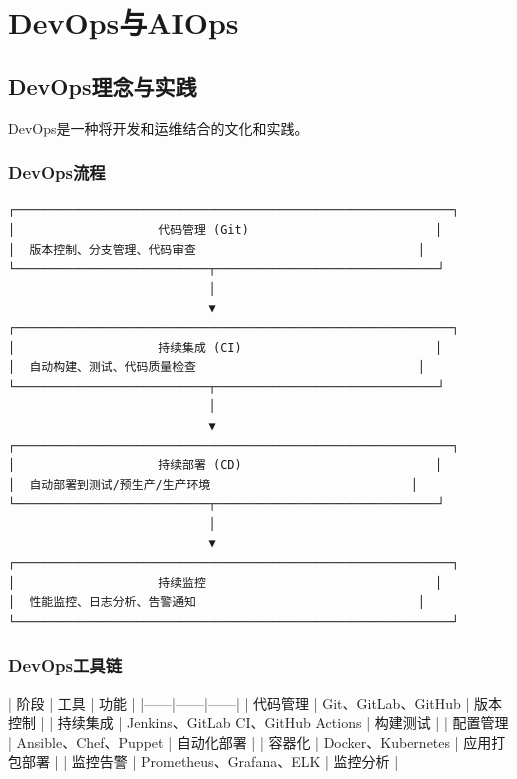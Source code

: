 \documentclass[12pt,UTF8]{ctexbook}
\begin{document}
\chapter{DevOps与AIOps}
\label{chap:devops-aiops}

\section{DevOps理念与实践}
\label{sec:devops}

DevOps是一种将开发和运维结合的文化和实践。

\subsection{DevOps流程}

\begin{lstlisting}
┌─────────────────────────────────────────────────────────────┐
│                    代码管理 (Git)                          │
│  版本控制、分支管理、代码审查                               │
└───────────────────────────┬───────────────────────────────┘
                            │
                            ▼
┌─────────────────────────────────────────────────────────────┐
│                    持续集成 (CI)                           │
│  自动构建、测试、代码质量检查                               │
└───────────────────────────┬───────────────────────────────┘
                            │
                            ▼
┌─────────────────────────────────────────────────────────────┐
│                    持续部署 (CD)                           │
│  自动部署到测试/预生产/生产环境                            │
└───────────────────────────┬───────────────────────────────┘
                            │
                            ▼
┌─────────────────────────────────────────────────────────────┐
│                    持续监控                                │
│  性能监控、日志分析、告警通知                               │
└─────────────────────────────────────────────────────────────┘
\end{lstlisting}

\subsection{DevOps工具链}

| 阶段 | 工具 | 功能 |
|------|------|------|
| 代码管理 | Git、GitLab、GitHub | 版本控制 |
| 持续集成 | Jenkins、GitLab CI、GitHub Actions | 构建测试 |
| 配置管理 | Ansible、Chef、Puppet | 自动化部署 |
| 容器化 | Docker、Kubernetes | 应用打包部署 |
| 监控告警 | Prometheus、Grafana、ELK | 监控分析 |
\end{document}
